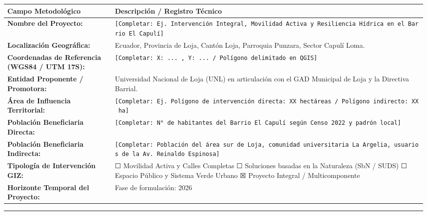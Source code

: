 \documentclass[
  letterpaper,
  DIV=11,
  numbers=noendperiod]{scrreprt}
\newcounter{none} %
\begin{document}
{\def\LTcaptype{none} %
\begin{longtable}[]{@{}
  >{\raggedright\arraybackslash}p{}
  >{\raggedright\arraybackslash}p{}@{}}
\toprule\noalign{}
\begin{minipage}[b]{\linewidth}\raggedright
Campo Metodológico
\end{minipage} & \begin{minipage}[b]{\linewidth}\raggedright
Descripción / Registro Técnico
\end{minipage} \\
\midrule\noalign{}
\endhead
\bottomrule\noalign{}
\endlastfoot
\textbf{Nombre del Proyecto:} &
\texttt{{[}Completar:\ Ej.\ Intervención\ Integral,\ Movilidad\ Activa\ y\ Resiliencia\ Hídrica\ en\ el\ Barrio\ El\ Capulí{]}} \\
\textbf{Localización Geográfica:} & Ecuador, Provincia de Loja, Cantón
Loja, Parroquia Punzara, Sector Capulí Loma. \\
\textbf{Coordenadas de Referencia (WGS84 / UTM 17S):} &
\texttt{{[}Completar:\ X:\ ...\ ,\ Y:\ ...\ /\ Polígono\ delimitado\ en\ QGIS{]}} \\
\textbf{Entidad Proponente / Promotora:} & Universidad Nacional de Loja
(UNL) en articulación con el GAD Municipal de Loja y la Directiva
Barrial. \\
\textbf{Área de Influencia Territorial:} &
\texttt{{[}Completar:\ Ej.\ Polígono\ de\ intervención\ directa:\ XX\ hectáreas\ /\ Polígono\ indirecto:\ XX\ ha{]}} \\
\textbf{Población Beneficiaria Directa:} &
\texttt{{[}Completar:\ N°\ de\ habitantes\ del\ Barrio\ El\ Capulí\ según\ Censo\ 2022\ y\ padrón\ local{]}} \\
\textbf{Población Beneficiaria Indirecta:} &
\texttt{{[}Completar:\ Población\ del\ área\ sur\ de\ Loja,\ comunidad\ universitaria\ La\ Argelia,\ usuarios\ de\ la\ Av.\ Reinaldo\ Espinosa{]}} \\
\textbf{Tipología de Intervención GIZ:} & ☐ Movilidad Activa y Calles
Completas ☐ Soluciones basadas en la Naturaleza (SbN / SUDS) ☐ Espacio
Público y Sistema Verde Urbano ☒ Proyecto Integral / Multicomponente \\
\textbf{Horizonte Temporal del Proyecto:} & Fase de formulación: 2026 \\
\end{longtable}
}

\begin{center}\rule{0.5\linewidth}{0.5pt}\end{center}
\end{document}
